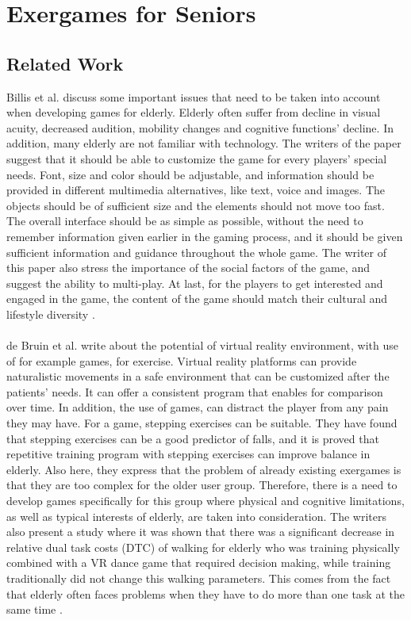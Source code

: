 \chapter{Exergames for Seniors}
\section{Related Work}
Billis et al. \cite{Billis} discuss some important issues that need to be taken into account when developing games for elderly. Elderly often suffer from decline in visual acuity, decreased audition, mobility changes and cognitive functions’ decline. In addition, many elderly are not familiar with technology. The writers of the paper suggest that it should be able to customize the game for every players’ special needs. Font, size and color should be adjustable, and information should be provided in different multimedia alternatives, like text, voice and images. The objects should be of sufficient size and the elements should not move too fast. The overall interface should be as simple as possible, without the need to remember information given earlier in the gaming process, and it should be given sufficient information and guidance throughout the whole game. The writer of this paper also stress the importance of the social factors of the game, and suggest the ability to multi-play. At last, for the players to get interested and engaged in the game, the content of the game should match their cultural and lifestyle diversity \cite{Billis}. \\ \\
de Bruin et al. \cite{bruin} write about the potential of virtual reality environment, with use of for example games, for exercise. Virtual reality platforms can provide naturalistic movements in a safe environment that can be customized after the patients' needs. It can offer a consistent program that enables for comparison over time. In addition, the use of games, can distract the player from any pain they may have. For a game, stepping exercises can be suitable. They have found that stepping exercises can be a good predictor of falls, and it is proved that repetitive training program with stepping exercises can improve balance in elderly. Also here, they express that the problem of already existing exergames is that they are too complex for the older user group. Therefore, there is a need to develop games specifically for this group where physical and cognitive limitations, as well as typical interests of elderly, are taken into consideration. The writers also present a study where it was shown that there was a significant decrease in relative dual task costs (DTC) of walking for elderly who was training physically combined with a VR dance game that required decision making, while training traditionally did not change this walking parameters. This comes from the fact that elderly often faces problems when they have to do more than one task at the same time \cite{bruin}. \\ \\
